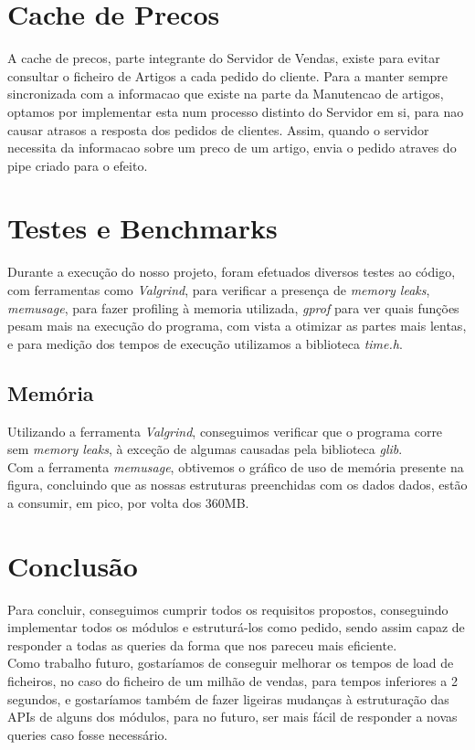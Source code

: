 \documentclass[a4paper]{report}
\begin{document}
\chapter{Cache de Precos}

A cache de precos, parte integrante do Servidor de Vendas, existe para
evitar consultar o ficheiro de Artigos a cada pedido do cliente.
Para a manter sempre sincronizada com a informacao que existe na parte da
Manutencao de artigos, optamos por implementar esta num processo distinto
do Servidor em si, para nao causar atrasos a resposta dos pedidos de clientes.
Assim, quando o servidor necessita da informacao sobre um preco de um artigo,
envia o pedido atraves do pipe criado para o efeito.

\chapter{Testes e Benchmarks}

Durante a execução do nosso projeto, foram efetuados diversos testes ao código, com
ferramentas como \textit{Valgrind}, para verificar a presença de \textit{memory 
leaks}, \textit{memusage}, para fazer profiling à memoria utilizada, \textit{gprof}
para ver quais funções pesam mais na execução do programa, com vista a otimizar as
partes mais lentas, e para medição dos tempos de execução utilizamos a biblioteca
\textit{time.h}.

\section{Memória}

Utilizando a ferramenta \textit{Valgrind}, conseguimos verificar que o programa
corre sem \textit{memory leaks}, à exceção de algumas causadas pela biblioteca
\textit{glib}.\\

Com a ferramenta \textit{memusage}, obtivemos o gráfico de uso de memória presente
na figura, concluindo que as nossas estruturas preenchidas com
os dados dados, estão a consumir, em pico, por volta dos 360MB.

\chapter{Conclusão}

Para concluir, conseguimos cumprir todos os requisitos propostos, conseguindo implementar
todos os módulos e estruturá-los como pedido, sendo assim capaz de responder a todas as 
queries da forma que nos pareceu mais eficiente.\\
Como trabalho futuro, gostaríamos de conseguir melhorar os tempos de load de ficheiros,
no caso do ficheiro de um milhão de vendas, para tempos inferiores a 2 segundos, e
gostaríamos também de fazer ligeiras mudanças à estruturação das APIs de alguns dos 
módulos, para no futuro, ser mais fácil de responder a novas queries caso fosse 
necessário.

\appendix
\end{document}
